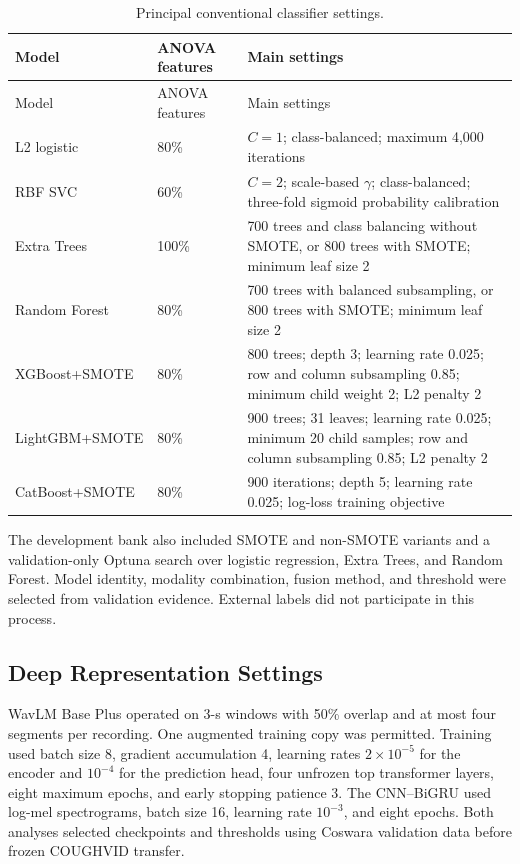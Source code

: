 \begingroup
\small
\begin{longtable}{L{0.22\textwidth}L{0.12\textwidth}L{0.56\textwidth}}
\caption{Principal conventional classifier settings.}
\label{tab:model-settings}\\
\toprule
Model & ANOVA features & Main settings \\
\midrule
\endfirsthead
\toprule
Model & ANOVA features & Main settings \\
\midrule
\endhead
L2 logistic & 80\% & $C=1$; class-balanced; maximum 4,000 iterations \\
RBF SVC & 60\% & $C=2$; scale-based $\gamma$; class-balanced; three-fold
sigmoid probability calibration \\
Extra Trees & 100\% & 700 trees and class balancing without SMOTE, or 800
trees with SMOTE; minimum leaf size 2 \\
Random Forest & 80\% & 700 trees with balanced subsampling, or 800 trees with
SMOTE; minimum leaf size 2 \\
XGBoost+SMOTE & 80\% & 800 trees; depth 3; learning rate 0.025; row and column
subsampling 0.85; minimum child weight 2; L2 penalty 2 \\
LightGBM+SMOTE & 80\% & 900 trees; 31 leaves; learning rate 0.025; minimum 20
child samples; row and column subsampling 0.85; L2 penalty 2 \\
CatBoost+SMOTE & 80\% & 900 iterations; depth 5; learning rate 0.025; log-loss
training objective \\
\bottomrule
\end{longtable}
\endgroup

The development bank also included SMOTE and non-SMOTE variants and a
validation-only Optuna search over logistic regression, Extra Trees, and
Random Forest. Model identity, modality combination, fusion method, and
threshold were selected from validation evidence. External labels did not
participate in this process.

\subsection{Deep Representation Settings}

WavLM Base Plus operated on 3-s windows with 50\% overlap and at most four
segments per recording. One augmented training copy was permitted. Training
used batch size 8, gradient accumulation 4, learning rates $2\times10^{-5}$
for the encoder and $10^{-4}$ for the prediction head, four unfrozen top
transformer layers, eight maximum epochs, and early stopping patience 3. The
CNN--BiGRU used log-mel spectrograms, batch size 16, learning rate $10^{-3}$,
and eight epochs. Both analyses selected checkpoints and thresholds using
Coswara validation data before frozen COUGHVID transfer.

